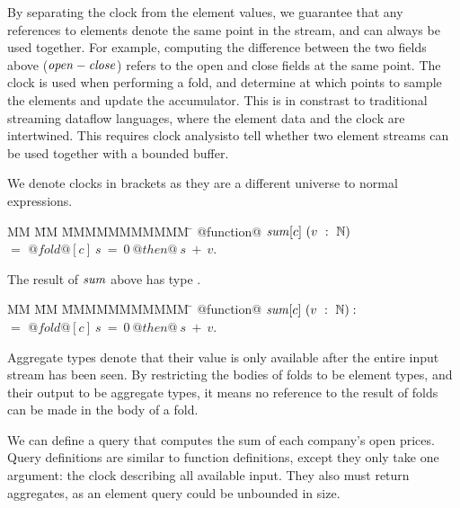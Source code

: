By separating the clock from the element values, we guarantee that any references to elements denote the same point in the stream, and can always be used together.
For example, computing the difference between the two fields above ($\mathit{open} - \mathit{close}$) refers to the open and close fields at the same point.
The clock is used when performing a fold, and determine at which points to sample the elements and update the accumulator.
This is in constrast to traditional streaming dataflow languages, where the element data and the clock are intertwined.
This requires clock analysis\CITE to tell whether two element streams can be used together with a bounded buffer. 

We denote clocks in brackets as they are a different universe to normal expressions.
 

\begin{tabbing}
MM \= MM \= MMMMMMMMMMM \= \kill
@function@ 
$\mathit{sum}[c]~(v~:~\mathbb{N})$    \\
\> $=$  \> $@fold@[c]~s~=~0~@then@~s~+~v$. \\
\end{tabbing}

The result of $\mathit{sum}$ above has type .

\begin{tabbing}
MM \= MM \= MMMMMMMMMMM \= \kill
@function@ 
$\mathit{sum}[c]~(v~:~\mathbb{N}) : $    \\
\> $=$  \> $@fold@[c]~s~=~0~@then@~s~+~v$. \\
\end{tabbing}



Aggregate types denote that their value is only available after the entire input stream has been seen. 
By restricting the bodies of folds to be element types, and their output to be aggregate types, it means no reference to the result of folds can be made in the body of a fold. 

We can define a query that computes the sum of each company's open prices.
Query definitions are similar to function definitions, except they only take one argument: the clock describing all available input.
They also must return aggregates, as an element query could be unbounded in size.

